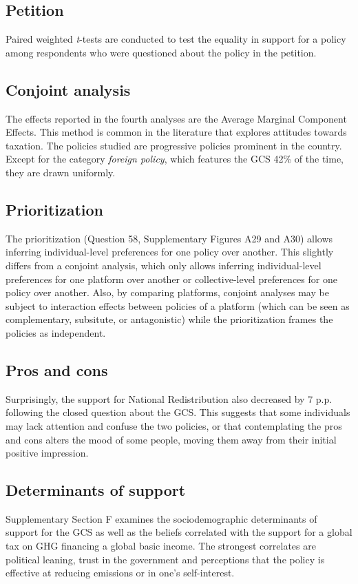 \begin{small}
\subsection*{\small Petition}
Paired weighted \textit{t}-tests are conducted to test the equality in support for a policy among respondents who were questioned about the policy in the petition.

\subsection*{\small Conjoint analysis}
The effects reported in the fourth analyses are the Average Marginal Component Effects.\cite{hainmueller_causal_2014} This method is common in the literature that explores attitudes towards taxation.\cite{bechtel_reforms_2020,ballard-rosa_structure_2017} The policies studied are progressive policies prominent in the country. Except for the category \textit{foreign policy}, which features the GCS 42\% of the time, they are drawn uniformly.

\subsection*{\small Prioritization}
The prioritization (Question 58, Supplementary Figures A29 and A30) allows inferring individual-level preferences for one policy over another. This slightly differs from a conjoint analysis, which only allows inferring individual-level preferences for one platform over another or collective-level preferences for one policy over another. Also, by comparing platforms, conjoint analyses may be subject to interaction effects between policies of a platform (which can be seen as complementary, subsitute, or antagonistic) while the prioritization frames the policies as independent.

\subsection*{\small Pros and cons}
Surprisingly, the support for National Redistribution also decreased by 7 p.p. following the closed question about the GCS. This suggests that some individuals may lack attention and confuse the two policies, or that contemplating the pros and cons alters the mood of some people, moving them away from their initial positive impression.

\subsection*{\small Determinants of support}
Supplementary Section F examines the sociodemographic determinants of support for the GCS as well as the beliefs correlated with the support for a global tax on GHG financing a global basic income. The strongest correlates are political leaning, trust in the government and perceptions that the policy is effective at reducing emissions or in one's self-interest.


\end{small}
